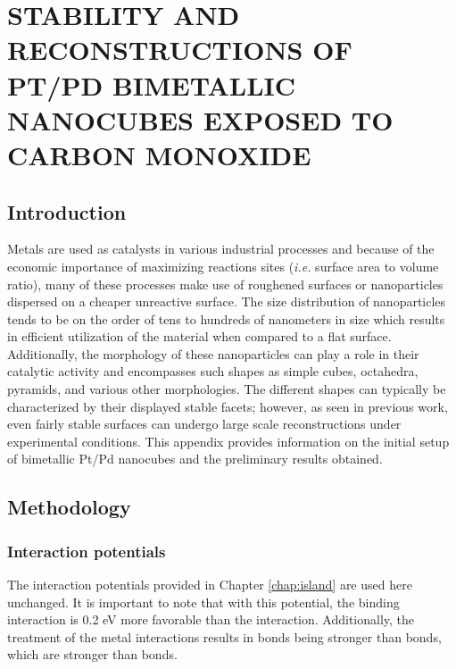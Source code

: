 \chapter{STABILITY AND RECONSTRUCTIONS OF PT/PD BIMETALLIC NANOCUBES EXPOSED TO CARBON MONOXIDE}
\label{app:cube}

\section{Introduction}

Metals are used as catalysts in various industrial processes and because of the
economic importance of maximizing reactions sites ({\em i.e.} surface area to volume ratio),
many of these processes make use of roughened surfaces or nanoparticles
dispersed on a cheaper unreactive surface.\citep{Munnik:2015qf, Graham:2007ng}
The size distribution of nanoparticles tends to be on the order of tens to
hundreds of nanometers in size which results in efficient utilization of the
material when compared to a flat surface.\citep{Zhang:2011ne, Liu:2013hf}
Additionally, the morphology of these nanoparticles can play a role in their
catalytic activity and encompasses such shapes as simple cubes, octahedra, pyramids, and various other
morphologies.\citep{Wang:2015qb, Ahmadi:2015os, Wang:2016dg} The different
shapes can typically be characterized by their displayed stable facets;
however, as seen in previous work\citep{Tao:2010aa, Michalka:2013aa,
Michalka:2015aa, Kim:2016cr}, even fairly stable surfaces can undergo large
scale reconstructions under experimental conditions. This appendix provides
information on the initial setup of bimetallic Pt/Pd nanocubes and the
preliminary results obtained. 

\section{Methodology}
\subsection{Interaction potentials}
The interaction potentials provided in Chapter \ref{chap:island} 
are used here unchanged.\citep{Michalka:2015aa} It is important to note
that with this potential, the  binding interaction is 0.2
eV more favorable than the  interaction. Additionally,
the treatment of the metal interactions results in  bonds
being stronger than  bonds, which are stronger than
 bonds.

